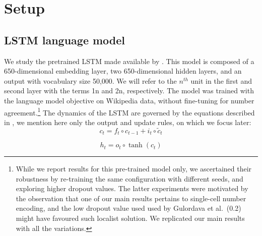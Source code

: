 
\section{Setup}


\subsection{LSTM language model}\label{ssec:lstm_lm}
We study the pretrained LSTM made available by
.  This model is composed of a
650-dimensional embedding layer, two 650-dimensional hidden layers,
and an output with vocabulary size 50,000. We will refer to the
$n^{th}$ unit in the first and second layer with the terms \unit{1}{n}
and \unit{2}{n}, respectively. The model was trained with the language
model objective on Wikipedia data, without fine-tuning for number
agreement.\footnote{While we report results for this pre-trained model
  only, we ascertained their robustness by re-training the same
  configuration with different seeds, and exploring higher dropout
  values. The latter experiments were motivated by the observation
  that one of our main results pertains to single-cell number
  encoding, and the low dropout value used used by Gulordava et
  al.~(0.2) might have favoured such localist solution. We replicated
  our main results with all the variations.} The dynamics of the LSTM
are governed by the equations described in
, we mention here only the output
and update rules, on which we focus later:
\begin{equation} \label{eq:update-rule}
     c_t = f_t\circ c_{t-1} + i_t\circ \widetilde{c}_t
\end{equation}

\begin{equation} \label{eq:output}
     h_t = o_t\circ \tanh(c_t)
\end{equation}



